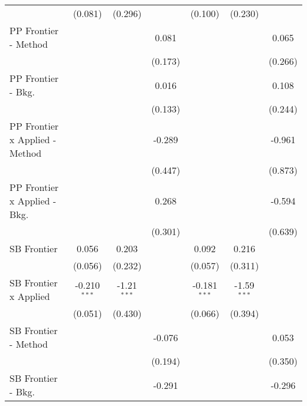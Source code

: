 \begin{tabular}{lcccccc}
                                  & (0.081)        & (0.296)       &               & (0.100)        & (0.230)       &   \\   
   PP Frontier - Method           &                &               & 0.081         &                &               & 0.065\\   
                                  &                &               & (0.173)       &                &               & (0.266)\\   
   PP Frontier - Bkg.             &                &               & 0.016         &                &               & 0.108\\   
                                  &                &               & (0.133)       &                &               & (0.244)\\   
   PP Frontier x Applied - Method &                &               & -0.289        &                &               & -0.961\\   
                                  &                &               & (0.447)       &                &               & (0.873)\\   
   PP Frontier x Applied - Bkg.   &                &               & 0.268         &                &               & -0.594\\   
                                  &                &               & (0.301)       &                &               & (0.639)\\   
   SB Frontier                    & 0.056          & 0.203         &               & 0.092          & 0.216         &   \\   
                                  & (0.056)        & (0.232)       &               & (0.057)        & (0.311)       &   \\   
   SB Frontier x Applied          & -0.210$^{***}$ & -1.21$^{***}$ &               & -0.181$^{***}$ & -1.59$^{***}$ &   \\   
                                  & (0.051)        & (0.430)       &               & (0.066)        & (0.394)       &   \\   
   SB Frontier - Method           &                &               & -0.076        &                &               & 0.053\\   
                                  &                &               & (0.194)       &                &               & (0.350)\\   
   SB Frontier - Bkg.             &                &               & -0.291        &                &               & -0.296\\   

\end{tabular}
